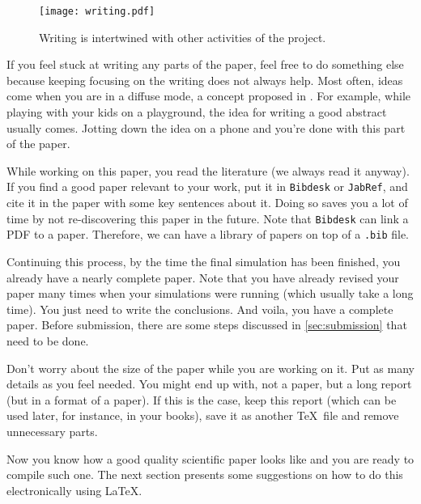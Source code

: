 \documentclass[authoryear,3p,times,preprint,review,fleqn]{elsarticle}
\numberwithin{equation}{section}
\theoremstyle{remark}
\begin{document}

 \begin{figure}[!ht]
      \centering
      \texttt{[image: writing.pdf]}
      \caption{Writing is intertwined with other activities of the project.}
      \label{fig:writing}
    \end{figure}

If you feel stuck at writing any parts of the paper, feel free to do something else because keeping focusing on the writing does not always help. Most often, ideas come when you are in a diffuse mode, a concept proposed in \cite{Oakley:2018a}. For example, while playing with your kids on a playground, the idea for writing a good abstract usually comes. Jotting down the idea on a phone and you're done with this part of the paper.

While working on this paper, you read the literature (we always read it anyway). If you find a good paper relevant to your work, put it in \texttt{Bibdesk} or \texttt{JabRef}, and cite it in the paper with some key sentences about it. Doing so saves you a lot of time by not re-discovering this paper in the future. Note that \texttt{Bibdesk} can link a PDF to a paper. Therefore, we can have a library of papers on top of a \texttt{.bib} file. 

Continuing this process, by the time the final simulation has been finished, you already have a nearly complete paper. Note that you have already revised your paper many times when your simulations were running (which usually take a long time).
You just need to write the conclusions. And voila, you have a complete paper. Before submission, there are some steps discussed in \cref{sec:submission} that need to be done.

Don't worry about the size of the paper while you are working on it. Put as many details as you feel needed. You might end up with, not a paper, but a long report (but in a format of a paper). If this is the case, keep this report (which can be used later, for instance, in your books), save it as another \TeX\ file and remove unnecessary parts.

Now you know how a good quality scientific paper looks like and you are ready to compile such one. The next section presents some suggestions on how to do this electronically using \LaTeX. \\

% 
\end{document}
